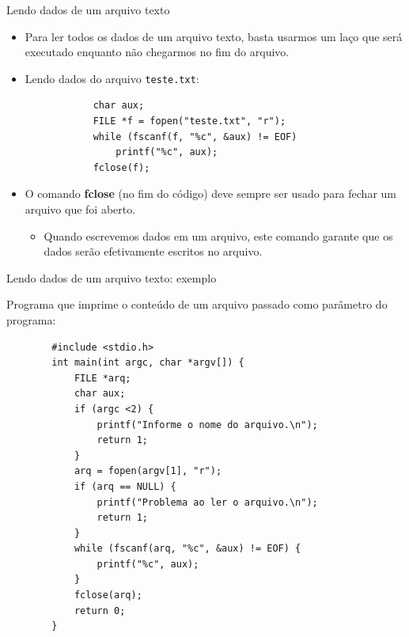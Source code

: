 \documentclass[handout]{beamer}
\begin{document}
\begin{frame}[fragile]{Lendo dados de um arquivo texto}

    \begin{itemize}
        \item Para ler todos os dados de um arquivo texto, basta usarmos um laço
        que será executado enquanto não chegarmos no fim do arquivo.

        \item Lendo dados do arquivo \texttt{teste.txt}:
        \begin{verbatim}
            char aux;
            FILE *f = fopen("teste.txt", "r");
            while (fscanf(f, "%c", &aux) != EOF)
                printf("%c", aux);
            fclose(f);
        \end{verbatim}

        \item O comando \textbf{fclose} (no fim do código) deve sempre ser usado para fechar um arquivo que foi aberto.
        \begin{itemize}
            \item Quando escrevemos dados em um arquivo, este comando garante que os dados serão
            efetivamente escritos no arquivo.
        \end{itemize}
    \end{itemize}

\end{frame}

\begin{frame}[fragile]{Lendo dados de um arquivo texto: exemplo}

    Programa que imprime o conteúdo de um arquivo passado como parâmetro do programa:

    \begin{verbatim}
        #include <stdio.h>
        int main(int argc, char *argv[]) {
            FILE *arq;
            char aux;
            if (argc <2) {
                printf("Informe o nome do arquivo.\n");
                return 1;
            }
            arq = fopen(argv[1], "r");
            if (arq == NULL) {
                printf("Problema ao ler o arquivo.\n");
                return 1;
            }
            while (fscanf(arq, "%c", &aux) != EOF) {
                printf("%c", aux);
            }
            fclose(arq);
            return 0;
        }
    \end{verbatim}

\end{frame}
\end{document}
